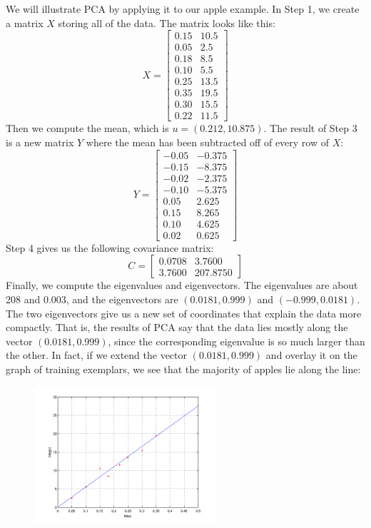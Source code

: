 We will illustrate PCA by applying it to our apple example. In Step 1, we create a matrix $X$ storing all of the data. The matrix looks like this: 
	\[
	X= 
	\begin{bmatrix}
	0.15 & 10.5 \\
	0.05 & 2.5 \\
	0.18 & 8.5 \\
	0.10 & 5.5 \\
	0.25 & 13.5 \\
	0.35 & 19.5 \\
	0.30 & 15.5 \\
	0.22 & 11.5 
	\end{bmatrix}
	\]
Then we compute the mean, which is $u = (0.212,10.875)$. The result of Step 3 is a new matrix $Y$ where the mean has been subtracted off of every row of $X$: 
	\[
	Y=
	\begin{bmatrix}
	-0.05 & -0.375 \\
	-0.15 & -8.375 \\
	-0.02 & -2.375 \\
	-0.10 & -5.375 \\
	0.05 & 2.625 \\
	0.15 & 8.265 \\
	0.10 & 4.625 \\
	0.02 & 0.625
	\end{bmatrix}
	\]
Step 4 gives us the following covariance matrix: 
	\[
	C=
	\begin{bmatrix}
	0.0708 & 3.7600 \\
	3.7600 & 207.8750 
	\end{bmatrix}
	\]
Finally, we compute the eigenvalues and eigenvectors. The eigenvalues are about 208 and 0.003, and the eigenvectors are $(0.0181, 0.999)$ and $(-0.999,0. 0181)$. The two eigenvectors give us a new set of coordinates that explain the data more compactly. That is, the results of PCA say that the data lies mostly along the vector $(0.0181, 0.999)$, since the corresponding eigenvalue is so much larger than the other. In fact, if we extend the vector $(0.0181, 0.999)$ and overlay it on the graph of training exemplars, we see that the majority of apples lie along the line:
	\begin{figure}[H]
	   \centering
	   \includegraphics[width=0.6\textwidth]{season3/304/images/applegraph2.png} 
	\end{figure}
